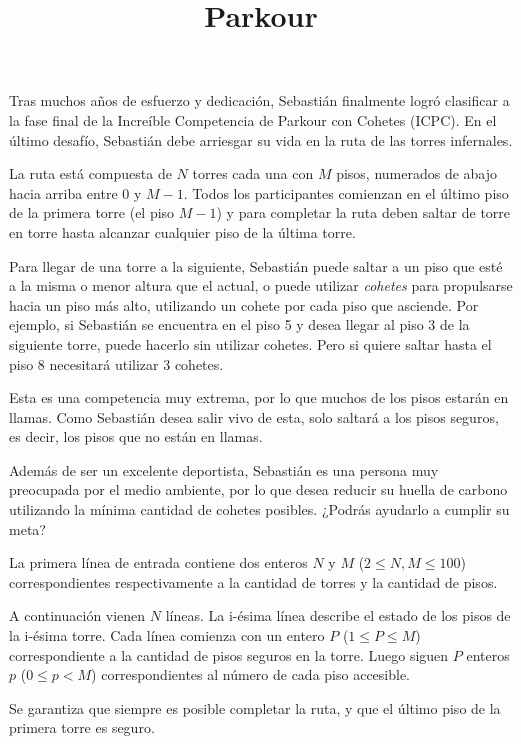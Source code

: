 \documentclass{oci}
\title{Parkour}
\begin{document}
\begin{problemDescription}
  Tras muchos años de esfuerzo y dedicación, Sebastián finalmente logró
  clasificar a la fase final de la Increíble Competencia de Parkour con
  Cohetes (ICPC).
  En el último desafío, Sebastián debe arriesgar
  su vida en la ruta de las torres infernales.

  La ruta está compuesta de $N$ torres cada una con
  $M$ pisos, numerados de abajo hacia arriba entre 0
  y $M-1$.
  Todos los participantes comienzan en el último piso de la primera
  torre (el piso $M-1$) y para completar la ruta deben saltar de torre
  en torre hasta alcanzar cualquier piso de la última torre.

  Para llegar de una torre a la siguiente, Sebastián puede saltar a un piso
  que esté a la misma o menor altura que el actual, o puede utilizar \emph{cohetes}
  para propulsarse hacia un piso más alto, utilizando un cohete por cada piso que asciende.
  Por ejemplo, si Sebastián se encuentra en el piso 5 y desea llegar
  al piso 3 de la siguiente torre, puede hacerlo sin utilizar cohetes.
  Pero si quiere saltar hasta el piso 8 necesitará utilizar 3 cohetes.

  Esta es una competencia muy extrema, por lo que muchos de los pisos
  estarán en llamas.
  Como Sebastián desea salir vivo de esta, solo saltará a los pisos
  seguros, es decir, los pisos que no están en llamas.

  Además de ser un excelente deportista, Sebastián es una persona muy
  preocupada por el medio ambiente, por lo que desea reducir su huella
  de carbono utilizando la mínima cantidad de cohetes posibles.
  ¿Podrás ayudarlo a cumplir su meta?

\end{problemDescription}

\begin{inputDescription}
  La primera línea de entrada contiene dos enteros $N$ y $M$ ($2 \leq N, M \leq 100$)
  correspondientes respectivamente a la cantidad de torres y la cantidad de pisos.

  A continuación vienen $N$ líneas.
  La i-ésima línea describe el estado de los pisos de la i-ésima torre.
  Cada línea comienza con un entero $P$ ($1 \leq P \leq M$) correspondiente
  a la cantidad de pisos seguros en la torre.
  Luego siguen $P$ enteros $p$ ($0 \leq p < M$) correspondientes al
  número de cada piso accesible.

  Se garantiza que siempre es posible completar la ruta, y que el
  último piso de la primera torre es seguro.
\end{inputDescription}
\end{document}
